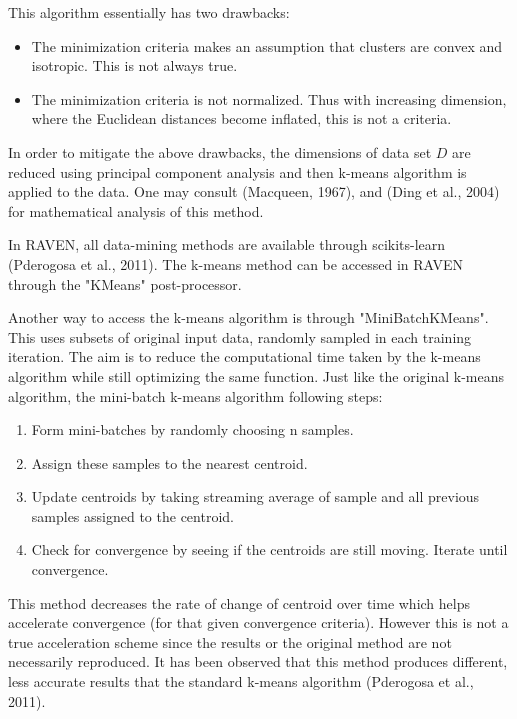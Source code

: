 \documentclass[11pt]{article}
\begin{document}
This algorithm essentially has two drawbacks:

\begin{itemize}
\item The minimization criteria makes an assumption that clusters are convex and isotropic. This is not always true.
\item The minimization criteria is not normalized. Thus with increasing dimension, where the Euclidean distances become inflated, this is not a criteria. 
\end{itemize}

In order to mitigate the above drawbacks, the dimensions of data set $D$ are reduced using principal component analysis and then k-means algorithm is applied to the data. One may consult (Macqueen, 1967), and (Ding et al., 2004) for mathematical analysis of this method. 

In RAVEN, all data-mining methods are available through scikits-learn (Pderogosa et al., 2011). The k-means method can be accessed in RAVEN through the "KMeans" post-processor. 

Another way to access the k-means algorithm is through "MiniBatchKMeans". This uses subsets of original input data, randomly sampled in each training iteration. The aim is to reduce the computational time taken by the k-means algorithm while still optimizing the same function. Just like the original k-means algorithm, the mini-batch k-means algorithm following steps:

\begin{enumerate}

\item Form mini-batches by randomly choosing n samples. 

\item Assign these samples to the nearest centroid. 

\item Update centroids by taking streaming average of sample and all previous samples assigned to the centroid. 

\item Check for convergence by seeing if the centroids are still moving. Iterate until convergence. 

\end{enumerate}

This method decreases the rate of change of centroid over time which helps accelerate convergence (for that given convergence criteria). However this is not a true acceleration scheme since the results or the original method are not necessarily reproduced. It has been observed that this method produces different, less accurate results that the standard k-means algorithm (Pderogosa et al., 2011). 
\end{document}
